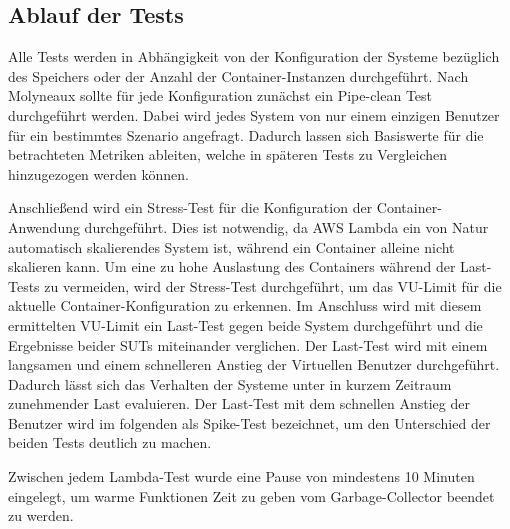 \subsection{Ablauf der Tests}
Alle Tests werden in Abhängigkeit von der Konfiguration der Systeme bezüglich des Speichers oder der Anzahl der Container-Instanzen durchgeführt.
Nach Molyneaux \cite{molyneaux_art_2014} sollte für jede Konfiguration zunächst ein Pipe-clean Test durchgeführt werden. Dabei wird jedes System von nur einem einzigen Benutzer für ein bestimmtes Szenario angefragt. Dadurch lassen sich Basiswerte für die betrachteten Metriken ableiten, welche in späteren Tests zu Vergleichen hinzugezogen werden können.

Anschließend wird ein Stress-Test für die Konfiguration der Container-Anwendung durchgeführt. Dies ist notwendig, da AWS Lambda ein von Natur automatisch skalierendes System ist, während ein Container alleine nicht skalieren kann. Um eine zu hohe Auslastung des Containers während der Last-Tests zu vermeiden, wird der Stress-Test durchgeführt, um das VU-Limit für die aktuelle Container-Konfiguration zu erkennen. 
Im Anschluss wird mit diesem ermittelten VU-Limit ein Last-Test gegen beide System durchgeführt und die Ergebnisse beider SUTs miteinander verglichen. 
Der Last-Test wird mit einem langsamen und einem schnelleren Anstieg der Virtuellen Benutzer durchgeführt. Dadurch lässt sich das Verhalten der Systeme unter in kurzem Zeitraum zunehmender Last evaluieren. Der Last-Test mit dem schnellen Anstieg der Benutzer wird im folgenden als Spike-Test bezeichnet, um den Unterschied der beiden Tests deutlich zu machen. 

Zwischen jedem Lambda-Test wurde eine Pause von mindestens 10 Minuten eingelegt, um warme Funktionen Zeit zu geben vom Garbage-Collector beendet zu werden.